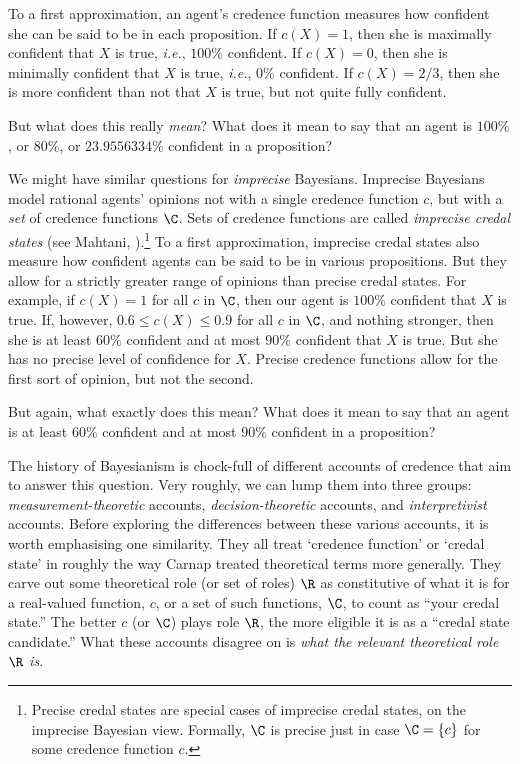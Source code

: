 To a first approximation, an agent's credence function measures how confident she can be said to be in each proposition. If $c(X)=1$, then she is maximally confident that $X$ is true, \textit{i.e.}, $100\%$ confident. If $c(X)=0$, then she is minimally confident that $X$ is true, \textit{i.e.}, $0\%$ confident. If $c(X)=2/3$, then she is more confident than not that $X$ is true, but not quite fully confident. 

But what does this really \textit{mean}? What does it mean to say that an agent is $100\%$, or $80\%$, or $23.9556334\%$ confident in a proposition?



We might have similar questions for \textit{imprecise} Bayesians. Imprecise Bayesians model rational agents' opinions not with a single credence function $c$, but with a \textit{set} of credence functions $\C$. Sets of credence functions are called \textit{imprecise credal states} (see Mahtani,  ).\footnote{Precise credal states are special cases of imprecise credal states, on the imprecise Bayesian view. Formally, $\C$ is precise just in case $\C=\left\{c\right\}$ for some credence function $c$.} To a first approximation, imprecise credal states also measure how confident agents can be said to be in various propositions. But they allow for a strictly greater range of opinions than precise credal states. For example, if $c(X)=1$ for all $c$ in $\C$, then our agent is $100\%$ confident that $X$ is true. If, however, $0.6\leq c(X)\leq0.9$ for all $c$ in $\C$, and nothing stronger, then she is at least $60\%$ confident and at most $90\%$ confident that $X$ is true. But she has no precise level of confidence for $X$. Precise credence functions allow for the first sort of opinion, but not the second.

But again, what exactly does this mean? What does it mean to say that an agent is at least $60\%$ confident and at most $90\%$ confident in a proposition?




The history of Bayesianism is chock-full of different accounts of credence that aim to answer this question. Very roughly, we can lump them into three groups: \textit{measurement-theoretic} accounts, \textit{decision-theoretic} accounts, and \textit{interpretivist} accounts. Before exploring the differences between these various accounts, it is worth emphasising one similarity. They all treat `credence function' or `credal state' in roughly the way Carnap treated theoretical terms more generally. They carve out some theoretical role (or set of roles) $\R$ as constitutive of what it is for a real-valued function, $c$, or a set of such functions, $\C$, to count as ``your credal state.'' The better $c$ (or $\C$) plays role $\R$, the more eligible it is as a ``credal state candidate.'' What these accounts disagree on is \textit{what the relevant theoretical role $\R$ is}.



